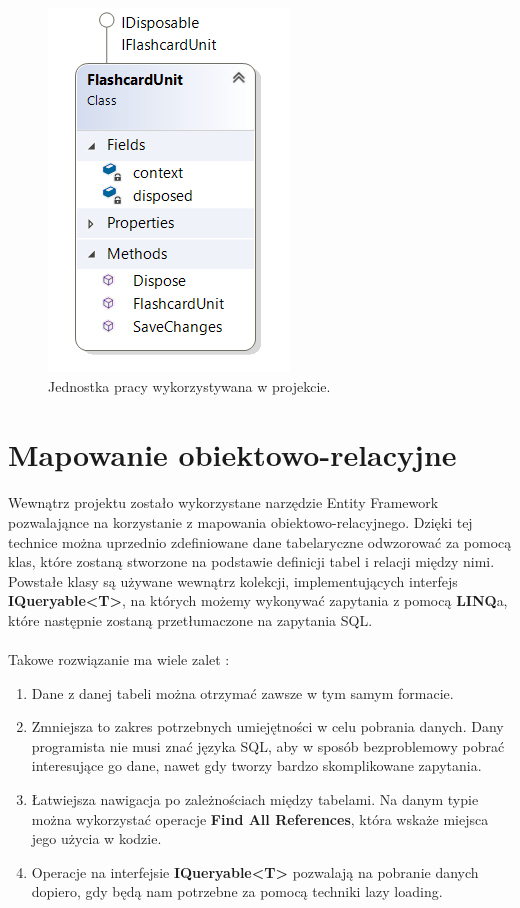 \begin{figure}[h]
	\centering
	\includegraphics{images/UnitOfWork.png}
	 \caption{Jednostka pracy wykorzystywana w projekcie.}
\end{figure}
\newpage

\section{Mapowanie obiektowo-relacyjne}

Wewnątrz projektu zostało wykorzystane narzędzie Entity Framework pozwalająnce na korzystanie z mapowania obiektowo-relacyjnego. Dzięki tej technice można uprzednio zdefiniowane dane tabelaryczne odwzorować za pomocą klas, które zostaną stworzone na podstawie definicji tabel i relacji między nimi. Powstałe klasy są używane wewnątrz kolekcji, implementujących interfejs \textbf{IQueryable<T>}, na których możemy wykonywać zapytania z pomocą \textbf{LINQ}a, które następnie zostaną przetłumaczone na zapytania SQL.
\\ \\
Takowe rozwiązanie ma wiele zalet :
\begin{enumerate}
	\item Dane z danej tabeli można otrzymać zawsze w tym samym formacie.
	\item Zmniejsza to zakres potrzebnych umiejętności w celu pobrania danych. Dany programista nie musi znać języka SQL, aby w sposób bezproblemowy pobrać interesujące go dane, nawet gdy tworzy bardzo skomplikowane zapytania.
	\item Łatwiejsza nawigacja po zależnościach między tabelami. Na danym typie można wykorzystać operacje \textbf{Find All References}, która wskaże miejsca jego użycia w kodzie.
	\item Operacje na interfejsie \textbf{IQueryable<T>} pozwalają na pobranie danych dopiero, gdy będą nam potrzebne za pomocą techniki lazy loading.
\end{enumerate}

